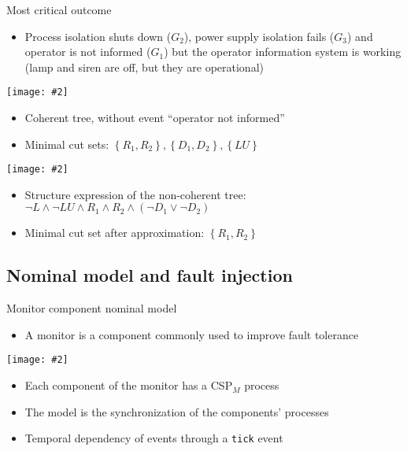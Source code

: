 \documentclass{beamer}
\newcommand{\includegraphicsaspectratio}[2][1]{%
  \texttt{[image: \#2]}%
}
\def\CSPm{CSP$_M$\xspace}
\begin{document}
\begin{frame}{Most critical outcome}
	\footnotesize
	\begin{itemize}
		\item Process isolation shuts down ($G_2$), power supply isolation fails ($G_3$) and operator is not informed ($G_1$) but the operator information system is working (lamp and siren are off, but they are operational)
	\end{itemize}
	\begin{minipage}{0.38\textwidth}
		\footnotesize
		\includegraphicsaspectratio[0.95]{outcome-4-coherent-ft}
		\begin{itemize}
			\item Coherent tree, without event ``operator not informed''
			\item Minimal cut sets: $\left\{R_1, R_2\right\}, \left\{D_1, D_2\right\}, \left\{LU\right\} $
		\end{itemize}
	\end{minipage}
	\begin{minipage}{0.52\textwidth}
		\footnotesize
		\includegraphicsaspectratio[0.95]{outcome-4-non-coherent-ft}
		\begin{itemize}
			\item Structure expression of the non-coherent tree: $\lnot L \land \lnot LU \land R_1 \land R_2 \land \left(\lnot D_1 \lor \lnot D_2\right)$
			\item Minimal cut set after approximation: $\left\{R_1, R_2\right\} $
		\end{itemize}
	\end{minipage}
\end{frame}

\subsection{Nominal model and fault injection}

\begin{frame}[fragile]{Monitor component nominal model}
	\begin{itemize}
		\item A monitor is a component commonly used to improve fault tolerance
	\end{itemize}
	\begin{center}
		\includegraphicsaspectratio[0.60]{blockDiagramMonitorInternals}
	\end{center}
	\begin{itemize}
		\item Each component of the monitor has a \CSPm process
		\item The model is the synchronization of the components' processes
		\item Temporal dependency of events through a \verb$tick$ event
	\end{itemize}
\end{frame}
\end{document}
